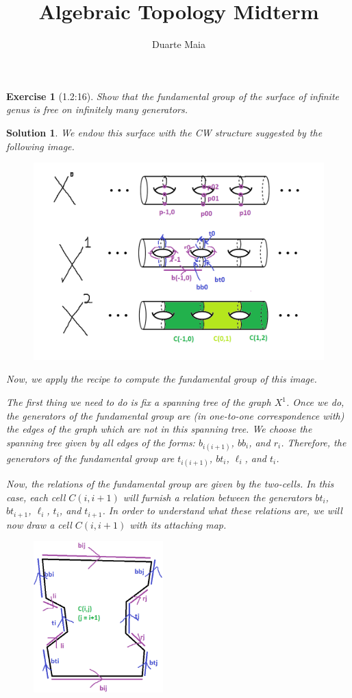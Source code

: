 \documentclass{article}
\title{Algebraic Topology Midterm}
\author{Duarte Maia}
\theoremstyle{plain}
\newtheorem*{ex}{Exercise}
\theoremstyle{nonumberplain}
\newtheorem{sol}{Solution}
\begin{document}
\maketitle

\begin{ex}[1.2:16]
Show that the fundamental group of the surface of infinite genus is free on infinitely many generators.
\end{ex}

\begin{sol}
We endow this surface with the CW structure suggested by the following image.
\begin{figure}[H]
\centering
\includegraphics[width=\linewidth]{mt1}
\end{figure}

Now, we apply the recipe to compute the fundamental group of this image.

The first thing we need to do is fix a spanning tree of the graph $X^1$. Once we do, the generators of the fundamental group are (in one-to-one correspondence with) the edges of the graph which are not in this spanning tree. We choose the spanning tree given by all edges of the forms: $b_{i(i+1)}$, $bb_i$, and $r_i$. Therefore, the generators of the fundamental group are $t_{i(i+1)}$, $bt_i$, $\ell_i$, and $t_i$.

Now, the relations of the fundamental group are given by the two-cells. In this case, each cell $C(i,i+1)$ will furnish a relation between the generators $bt_i$, $bt_{i+1}$, $\ell_i$, $t_i$, and $t_{i+1}$. In order to understand what these relations are, we will now draw a cell $C(i,i+1)$ with its attaching map.
\begin{figure}[H]
\centering
\includegraphics[width=5cm]{mt2}
\end{figure}


\end{sol}
\end{document}
